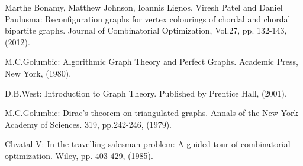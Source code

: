 \documentclass[runningheads]{llncs}
\begin{document}
\begin{thebibliography}{}
Marthe Bonamy, Matthew Johnson, Ioannis Lignos, Viresh Patel and Daniel Paulusma: Reconfiguration graphs for vertex colourings of chordal and chordal bipartite graphs. Journal of Combinatorial Optimization, Vol.27, pp. 132-143, (2012).


M.C.Golumbic: Algorithmic Graph Theory and Perfect Graphs. Academic Press, New York, (1980).


D.B.West: Introduction to Graph Theory. Published by Prentice Hall, (2001).

M.C.Golumbic: Dirac's theorem on triangulated graphs. Annals of the New York Academy of Sciences. 319, pp.242-246, (1979).

Chvatal V: In the travelling salesman problem: A guided tour of combinatorial optimization. Wiley, pp. 403-429, (1985).

\end{thebibliography}
\end{document}
